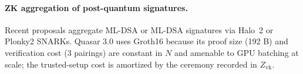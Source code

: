 \paragraph{ZK aggregation of post-quantum signatures.}
Recent proposals aggregate ML-DSA or ML-DSA signatures via Halo~2 or
Plonky2 SNARKs. Quasar 3.0 uses Groth16 because its proof size (192 B)
and verification cost (3 pairings) are constant in $N$ and amenable to
GPU batching at scale; the trusted-setup cost is amortized by the
ceremony recorded in $Z_\text{vk}$.


